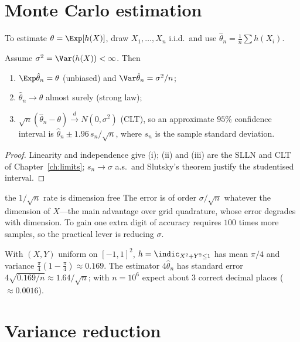 \section{Monte Carlo estimation}

To estimate $\theta=\Exp[h(X)]$, draw $X_1,\dots,X_n$ i.i.d.\ and use
$\hat\theta_n=\frac1n\sum h(X_i)$.

\begin{theorem}
Assume $\sigma^2=\Var(h(X))<\infty$. Then
\begin{enumerate}[label=(\roman*)]
\item $\Exp\hat\theta_n=\theta$ (unbiased) and $\Var\hat\theta_n=\sigma^2/n$;
\item $\hat\theta_n\to\theta$ almost surely (strong law);
\item $\sqrt n(\hat\theta_n-\theta)\xrightarrow{d}N(0,\sigma^2)$ (CLT), so an approximate
$95\%$ confidence interval is $\hat\theta_n\pm1.96\,s_n/\sqrt n$, where $s_n$ is the sample standard
deviation.
\end{enumerate}
\end{theorem}
\begin{proof}
Linearity and independence give (i); (ii) and (iii) are the SLLN and CLT of
Chapter~\ref{ch:limits}; $s_n\to\sigma$ a.s.\ and Slutsky's theorem justify the studentised interval.
\end{proof}

\begin{nuance}{the $1/\sqrt n$ rate is dimension free}
The error is of order $\sigma/\sqrt n$ whatever the dimension of $X$---the main advantage over grid
quadrature, whose error degrades with dimension. To gain one extra digit of accuracy requires
$100$ times more samples, so the practical lever is reducing $\sigma$.
\end{nuance}

\begin{example}[Estimating $\pi$]
With $(X,Y)$ uniform on $[-1,1]^2$, $h=\indic_{X^2+Y^2\le1}$ has mean $\pi/4$ and variance
$\tfrac\pi4(1-\tfrac\pi4)\approx0.169$. The estimator $4\hat\theta_n$ has standard error
$4\sqrt{0.169/n}\approx1.64/\sqrt n$; with $n=10^6$ expect about $3$ correct decimal places
($\approx0.0016$).
\end{example}

\section{Variance reduction}

